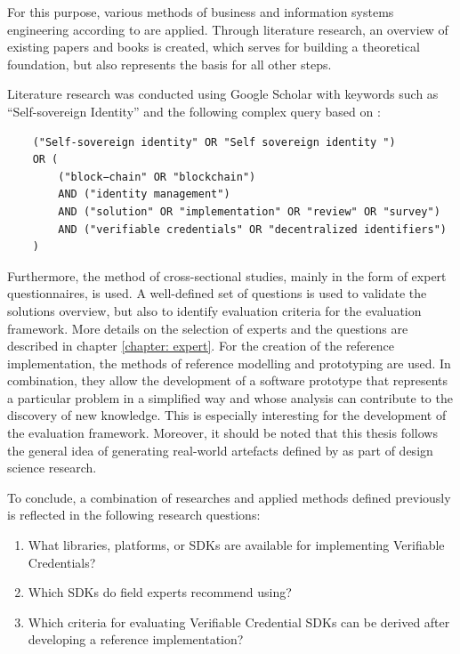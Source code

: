     For this purpose, various methods of business and information systems engineering according to \cite{wilde_forschungsmethoden_2007} are applied. Through literature research, an overview of existing papers and books is created, which serves for building a theoretical foundation, but also represents the basis for all other steps. 
    
    Literature research was conducted using Google Scholar with keywords such as “Self-sovereign Identity” and the following complex query based on \cite{van_bokkem_self-sovereign_2019}:
    \begin{verbatim}
    ("Self-sovereign identity" OR "Self sovereign identity ") 
    OR ( 
        ("block−chain" OR "blockchain") 
        AND ("identity management")
        AND ("solution" OR "implementation" OR "review" OR "survey")            
        AND ("verifiable credentials" OR "decentralized identifiers")
    )
    \end{verbatim}
    Furthermore, the method of cross-sectional studies, mainly in the form of expert questionnaires, is used. A well-defined set of questions is used to validate the solutions overview, but also to identify evaluation criteria for the evaluation framework. More details on the selection of experts and the questions are described in chapter \ref{chapter: expert}. For the creation of the reference implementation, the methods of reference modelling and prototyping are used. In combination, they allow the development of a software prototype that represents a particular problem in a simplified way and whose analysis can contribute to the discovery of new knowledge. This is especially interesting for the development of the evaluation framework. Moreover, it should be noted that this thesis follows the general idea of generating real-world artefacts defined by \cite{hevner_three_2007} as part of design science research.
    
    To conclude, a combination of researches and applied methods defined previously is reflected in the following research questions: 
    
    \begin{enumerate}[label=RQ\arabic*:]
      \item What libraries, platforms, or SDKs are available for implementing Verifiable Credentials?
      \item Which SDKs do field experts recommend using?
      \item Which criteria for evaluating Verifiable Credential SDKs can be derived after developing a reference implementation?
    \end{enumerate}